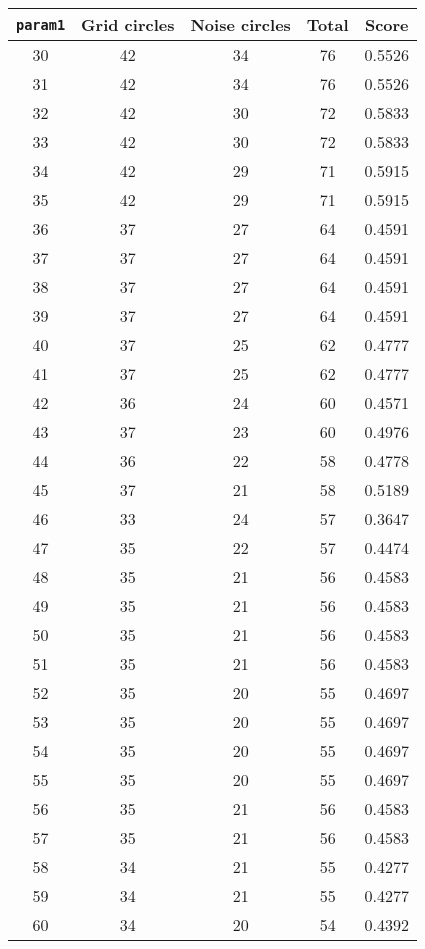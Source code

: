 \documentclass[letterpaper, 12pt]{article}
\begin{document}
\begin{longtable}{|c|c|c|c|c|}
\hline
\textbf{\texttt{param1}} & \textbf{Grid circles} & \textbf{Noise circles} & \textbf{Total} & \textbf{Score} \\
\hline
30 & 42 & 34 & 76 & 0.5526 \\
\hline
31 & 42 & 34 & 76 & 0.5526 \\
\hline
32 & 42 & 30 & 72 & 0.5833 \\
\hline
33 & 42 & 30 & 72 & 0.5833 \\
\hline
34 & 42 & 29 & 71 & 0.5915 \\
\hline
35 & 42 & 29 & 71 & 0.5915 \\
\hline
36 & 37 & 27 & 64 & 0.4591 \\
\hline
37 & 37 & 27 & 64 & 0.4591 \\
\hline
38 & 37 & 27 & 64 & 0.4591 \\
\hline
39 & 37 & 27 & 64 & 0.4591 \\
\hline
40 & 37 & 25 & 62 & 0.4777 \\
\hline
41 & 37 & 25 & 62 & 0.4777 \\
\hline
42 & 36 & 24 & 60 & 0.4571 \\
\hline
43 & 37 & 23 & 60 & 0.4976 \\
\hline
44 & 36 & 22 & 58 & 0.4778 \\
\hline
45 & 37 & 21 & 58 & 0.5189 \\
\hline
46 & 33 & 24 & 57 & 0.3647 \\
\hline
47 & 35 & 22 & 57 & 0.4474 \\
\hline
48 & 35 & 21 & 56 & 0.4583 \\
\hline
49 & 35 & 21 & 56 & 0.4583 \\
\hline
50 & 35 & 21 & 56 & 0.4583 \\
\hline
51 & 35 & 21 & 56 & 0.4583 \\
\hline
52 & 35 & 20 & 55 & 0.4697 \\
\hline
53 & 35 & 20 & 55 & 0.4697 \\
\hline
54 & 35 & 20 & 55 & 0.4697 \\
\hline
55 & 35 & 20 & 55 & 0.4697 \\
\hline
56 & 35 & 21 & 56 & 0.4583 \\
\hline
57 & 35 & 21 & 56 & 0.4583 \\
\hline
58 & 34 & 21 & 55 & 0.4277 \\
\hline
59 & 34 & 21 & 55 & 0.4277 \\
\hline
60 & 34 & 20 & 54 & 0.4392 \\

\end{longtable}
\end{document}
